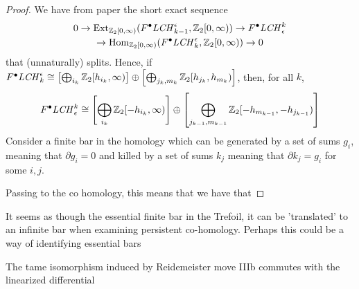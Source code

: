 \documentclass[11pt,oneside]{amsart}
\begin{document}
\begin{proof}
We have from {\color{red} paper} the short exact sequence
\begin{multline*}
    0 \rightarrow \operatorname{Ext}_{\mathbb{Z}_2[0,\infty)}(F^\bullet \mathit{LCH}^\epsilon_{k-1},\mathbb{Z}_2[0,\infty))\rightarrow F^\bullet\mathit{LCH}^k_\epsilon \\ \rightarrow \operatorname{Hom}_{\mathbb{Z}_2[0,\infty)}(F^\bullet\mathit{LCH}^\epsilon_k,\mathbb{Z}_2[0,\infty)) \rightarrow 0
\end{multline*}
that (unnaturally) splits.
Hence, if $F^\bullet\mathit{LCH}^\epsilon_k \cong \left[\bigoplus_{i_k} \mathbb{Z}_2[h_{i_k},\infty)\right]\oplus\left[\bigoplus_{j_k,m_k} \mathbb{Z}_2[h_{j_k}, h_{m_k})\right]$, then, for all $k$,
\[ F^\bullet\mathit{LCH}^k_\epsilon \cong \left[\bigoplus_{i_k} \mathbb{Z}_2[-h_{i_k},\infty)\right]\oplus\left[\bigoplus_{j_{k-1},m_{k-1}} \mathbb{Z}_2[-h_{m_{k-1}}, -h_{j_{k-1}})\right]\]
Consider a finite bar in the homology which can be generated by a set of sums ${g_i}$, meaning that $\partial g_i = 0$ and killed by a set of sums ${k_j}$ meaning that $\partial k_j = g_i$ for some $i,j$.

Passing to the co homology, this means that we have that 

\end{proof}








\begin{proposition}
    It seems as though the essential finite bar in the Trefoil, it can be 'translated' to an infinite bar when examining persistent co-homology. Perhaps this could be a way of identifying essential bars
\end{proposition}







\begin{theorem}

The tame isomorphism induced by Reidemeister move IIIb commutes with the linearized differential

\end{theorem}
\end{document}
